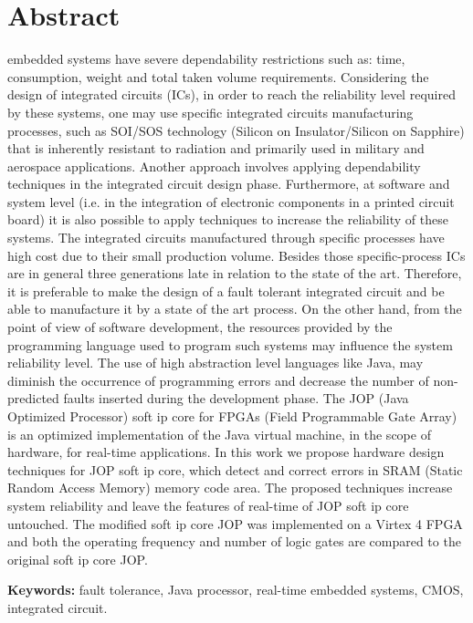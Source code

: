 \chapter*{Abstract}
\markboth{}{}

 embedded systems have severe dependability restrictions such as: time, consumption, weight and total taken volume requirements. Considering the design of integrated circuits (ICs), in order to reach the reliability level required by these systems, one may use specific integrated circuits manufacturing processes, such as SOI/SOS technology (Silicon on Insulator/Silicon on Sapphire) that is inherently resistant to radiation and primarily used in military and aerospace applications. Another approach involves applying dependability techniques in the integrated circuit design phase. Furthermore, at software and system level (i.e. in the integration of electronic components in a printed circuit board) it is also possible to apply techniques to increase the reliability of these systems.
	The integrated circuits manufactured through specific processes have high cost due to their small production volume. Besides those specific-process ICs are in general three generations late in relation to the state of the art. Therefore, it is preferable to make the design of a fault tolerant integrated circuit and be able to manufacture it by a state of the art process.
	On the other hand, from the point of view of software development, the resources provided by the programming language used to program such systems may influence the system reliability level. The use of high abstraction level languages like Java, may diminish the occurrence of programming errors and decrease the number of non-predicted faults inserted during the development phase. The  JOP (Java Optimized Processor) soft ip core for FPGAs (Field Programmable Gate Array) is an optimized implementation of the Java virtual machine, in the scope of hardware, for real-time applications.
	In this work we propose hardware design techniques for JOP soft ip core, which detect and correct errors in SRAM (Static Random Access Memory) memory code area. The proposed techniques increase system reliability and leave the features of real-time of JOP soft ip core untouched.
    The modified soft ip core JOP was implemented on a Virtex 4 FPGA and both the operating frequency and number of logic gates are compared to the original soft ip core JOP.
    
\textbf{Keywords:} fault tolerance, Java processor, real-time embedded systems, CMOS, integrated circuit.


